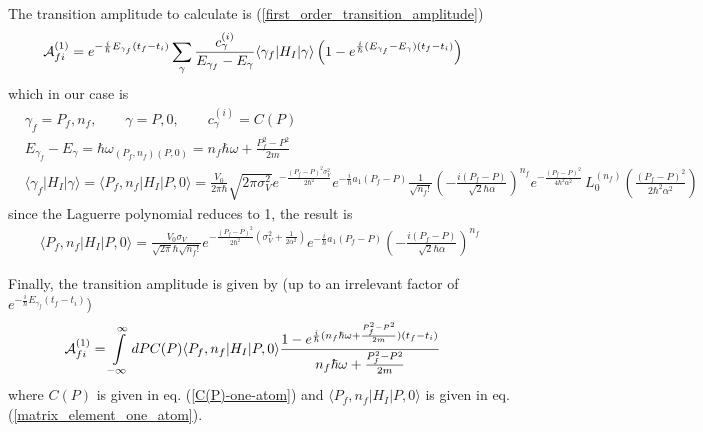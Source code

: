 The transition amplitude to calculate is (\ref{first_order_transition_amplitude})
\begin{align}
  {\cal A}_{fi}^{(1)} & =e^{-\frac{i}{\hbar}E_{\gamma_f}(t_f-t_i)}\sum_\gamma \frac{c_\gamma^{(i)}}{{E_{\gamma_f}- E_\gamma}} \langle \gamma_f|H_I|\gamma\rangle  \left(1-e^{\frac{i}{\hbar}({E_{\gamma_f}- E_\gamma})(t_f-t_i)} \right)
\end{align}
which in our case is
\begin{align}
   & \gamma_f = {P_f, n_f},\qquad \gamma = {P, 0},\qquad c_\gamma^{(i)} = C(P)\nonumber                                                                                                                                                                                                                                                                                                                       \\
   & E_{\gamma_f}- E_\gamma = \hbar\omega_{(P_f,n_f) (P,0)} = {n_f\hbar\omega+ \frac{P_f^2-P^2}{2m}}                                                                                                                                                                                                                                                                                                          \\
   & \langle \gamma_f|H_I|\gamma\rangle = \langle P_f,n_f |H_I|P,0\rangle = \frac{V_0}{2\pi\hbar}\sqrt{2\pi \sigma_V^2 }e^{-\frac{\left(P_f-P\right)^2 \sigma_V^2 }{2\hbar ^2}}e^{-\frac{i}{\hbar}a_1(P_f-P)}{\frac{1}{\sqrt{n_f!}}}\left(-\frac{i (P_f-P) }{\sqrt{2}\hbar\alpha }\right)^{n_f} e^{-\frac{(P_f-P)^2 }{4\hbar^2\alpha ^2}} \, L_{0}^{(n_f)}\!\left(\frac{(P_f-P)^2 }{2\hbar^2\alpha ^2}\right)
\end{align}
since the Laguerre polynomial reduces to 1, the  result is
\begin{align}
  \langle P_f,n_f |H_I|P,0\rangle = \frac{V_0\sigma_V}{\sqrt{2\pi}\hbar {\sqrt{n_f!}}}e^{-\frac{\left(P_f-P\right)^2 }{2\hbar ^2}(\sigma_V^2 +
      \frac{1}{2\alpha^2})}e^{-\frac{i}{\hbar}a_1(P_f-P)}\left(-\frac{i (P_f-P)  }{\sqrt{2}\hbar\alpha}\right)^{n_f}\label{matrix_element_one_atom}
\end{align}

Finally, the transition amplitude is given by (up to an irrelevant factor of $e^{-\frac{i}{\hbar}E_{\gamma_f}(t_f-t_i)}$)
\begin{align}
  \label{A1_one_atom_2}    {\cal A}_{fi}^{(1)} & =\int\limits_{-\infty}^{\infty}dP C(P) \langle P_f,n_f |H_I|P,0\rangle  \frac{1-e^{\frac{i}{\hbar}(n_f\hbar\omega+\frac{P_f^2-P^2}{2m})(t_f-t_i)}}{n_f\hbar\omega+\frac{P_f^2-P^2}{2m}}
\end{align}
where $C(P)$ is given in eq. (\ref{C(P)-one-atom}) and $\langle P_f,n_f |H_I|P,0\rangle$ is given in eq. (\ref{matrix_element_one_atom}).

